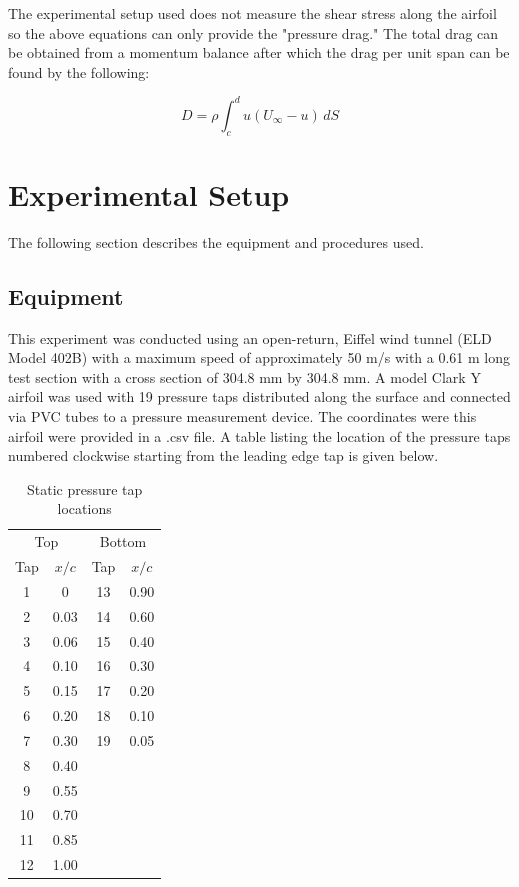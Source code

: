\documentclass[11pt, letterpaper]{article}
\begin{document}
The experimental setup used does not measure the shear stress along the airfoil so the above equations can only provide the "pressure drag." The total drag can be obtained from a momentum balance after which the drag per unit span can be found by the following:

\begin{equation}
D = \rho \int_{c}^{d} u \left(U_\infty - u\right) \, dS
\end{equation}

\section{Experimental Setup}

\noindent The following section describes the equipment and procedures used. 

\subsection{Equipment}

This experiment was conducted using an open-return, Eiffel wind tunnel (ELD Model 402B) with a maximum speed of approximately 50 m/s with a 0.61 m long test section with a cross section of 304.8 mm by 304.8 mm. A model Clark Y airfoil was used with 19 pressure taps distributed along the surface and connected via PVC tubes to a pressure measurement device. The coordinates were this airfoil were provided in a .csv file. A table listing the location of the pressure taps numbered clockwise starting from the leading edge tap is given below.

\begin{table}[h]
  \centering
  \caption{Static pressure tap locations}
  \begin{tabular}{cc|cc}
    \hline
    \multicolumn{2}{c|}{Top} & \multicolumn{2}{c}{Bottom} \\
    Tap & $x/c$ & Tap & $x/c$ \\
    \hline
    1 & 0 & 13 & 0.90 \\
    2 & 0.03 & 14 & 0.60 \\
    3 & 0.06 & 15 & 0.40 \\
    4 & 0.10 & 16 & 0.30 \\
    5 & 0.15 & 17 & 0.20 \\
    6 & 0.20 & 18 & 0.10 \\
    7 & 0.30 & 19 & 0.05 \\
    8 & 0.40 \\
    9 & 0.55 \\
    10 & 0.70 \\
    11 & 0.85 \\
    12 & 1.00 \\
    \hline
  \end{tabular}
\end{table}
\end{document}

